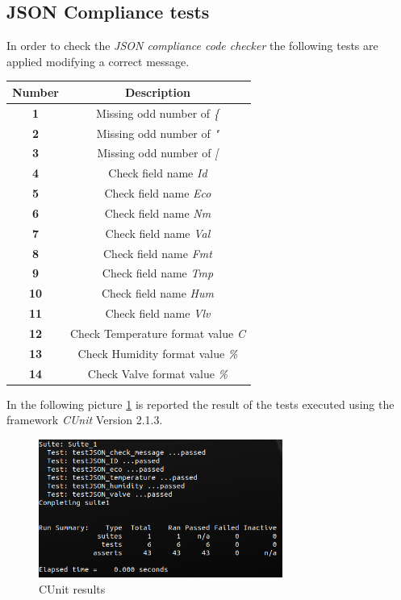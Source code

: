 \subsection{JSON Compliance  tests}
In order to check the \textit{JSON compliance code checker} the following tests are applied modifying a correct message.
\begin{center}
	\begin{tabular}{||c | c ||} 
		\hline
		Number			& 	Description \\ 
		\hline
		\textbf{1}		&	Missing odd number of \textit{\{}\\ 
		\hline
		\textbf{2}		&	Missing odd number of \textit{"}\\ 
		\hline
		\textbf{3}		&	Missing odd number of \textit{[}\\ 
		\hline
		\textbf{4}		&	Check field name \textit{Id} \\ 
		\hline
		\textbf{5}		&	Check field name \textit{Eco} \\ 
		\hline
		\textbf{6}		&	Check field name \textit{Nm} \\ 
		\hline
		\textbf{7}		&	Check field name \textit{Val} \\ 
		\hline
		\textbf{8}		&	Check field name \textit{Fmt} \\ 
		\hline
		\textbf{9}		&	Check field name \textit{Tmp} \\ 
		\hline
		\textbf{10}		&	Check field name \textit{Hum} \\ 
		\hline
		\textbf{11}		&	Check field name \textit{Vlv} \\ 
		\hline
		\textbf{12}		&	Check Temperature format value \textit{C} \\ 
		\hline
		\textbf{13}		&	Check Humidity format value \textit{\%} \\ 
		\hline
		\textbf{14}		&	Check Valve format value \textit{\%} \\ 
		\hline
	\end{tabular}
\end{center}

In the following picture \ref{fig:CUnit_result} is reported the result of the tests executed using the framework \textit{CUnit} Version 2.1.3.
\begin{figure}[H]
	\centering
	\includegraphics[width=8cm,keepaspectratio]{img/CUnit_result}
	\caption{CUnit results}
	\label{fig:CUnit_result}
\end{figure}


